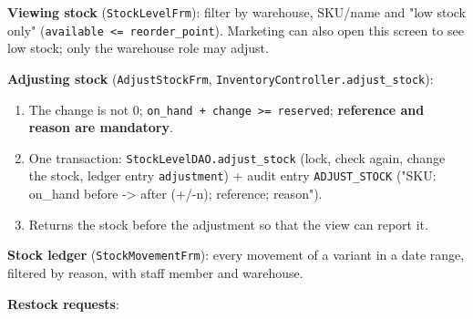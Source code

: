 \textbf{Viewing stock} (\texttt{StockLevelFrm}): filter by warehouse,
SKU/name and "low stock only"
(\texttt{available \textless{}=\allowbreak{} reorder\_\allowbreak{}point}). Marketing can also
open this screen to see low stock; only the warehouse role may adjust.

\textbf{Adjusting stock} (\texttt{AdjustStockFrm},
\texttt{InventoryController.\allowbreak{}adjust\_\allowbreak{}stock}):

\begin{enumerate}
\def\labelenumi{\arabic{enumi}.}
\tightlist
\item
  The change is not 0;
  \texttt{on\_\allowbreak{}hand + change \textgreater{}\allowbreak{}=\allowbreak{} reserved};
  \textbf{reference and reason are mandatory}.
\item
  One transaction: \texttt{StockLevelDAO.\allowbreak{}adjust\_\allowbreak{}stock} (lock, check
  again, change the stock, ledger entry \texttt{adjustment}) + audit
  entry \texttt{ADJUST\_\allowbreak{}STOCK} ("SKU: on\_hand before -\textgreater{}
  after (+/-n); reference; reason").
\item
  Returns the stock before the adjustment so that the view can report
  it.
\end{enumerate}

\textbf{Stock ledger} (\texttt{StockMovementFrm}): every movement of a
variant in a date range, filtered by reason, with staff member and
warehouse.

\textbf{Restock requests}:

